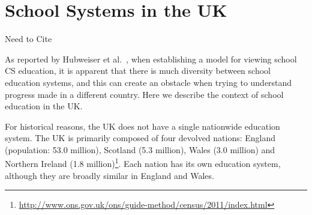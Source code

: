 \documentclass{sig-alternate}
\begin{document}
\section{School Systems in the UK}\label{sec:schools}

Need to Cite~\cite{Evans:2015}

As reported by Hubweiser et al.~\cite{hubwieser-et-al:2011}, when establishing a
model for viewing school CS education, it is apparent that there is
much diversity between school education systems, and this can create
an obstacle when trying to understand progress made in a different
country. Here we describe the context of school education in the UK.

For historical reasons, the UK does not have a single nationwide
education system.  The UK is primarily composed of four devolved
nations: England (population: 53.0 million), Scotland (5.3 million),
Wales (3.0 million) and Northern Ireland (1.8
million)\footnote{\url{http://www.ons.gov.uk/ons/guide-method/census/2011/index.html}}.
Each nation has its own education system, although they are broadly
similar in England and Wales.


\end{document}
